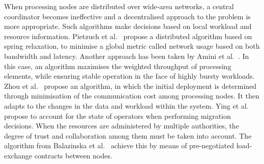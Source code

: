 When processing nodes are distributed over wide-area networks, a central coordinator becomes
ineffective and a decentralised approach to the problem is more appropriate. Such algorithms make
decisions based on local workload and resource information. Pietzuch et al.~\cite{sbon} propose a
distributed algorithm based on spring relaxation, to minimise a global metric called network usage based
on both bandwidth and latency. Another approach has been taken by Amini et al.~\cite{extreme-scale-sps}.
In this case, an algorithm maximises the weighted throughput of processing elements, while ensuring
stable operation in the face of highly bursty workloads. Zhou et al.~\cite{placement-zhou} propose an
algorithm, in which the initial deployment is determined through minimisation of the communication cost
among processing nodes. It then adapts to the changes in the data and workload within the system. Ying
et al.~\cite{placement-ying} propose to account for the state of operators when performing migration
decisions. When the resources are administered by multiple authorities, the degree of trust and
collaboration among them must be taken into account.
The algorithm from Balazinska et al.~\cite{medusa-load} achieve this by means of pre-negotiated
load-exchange contracts between nodes.
% 					
% 
